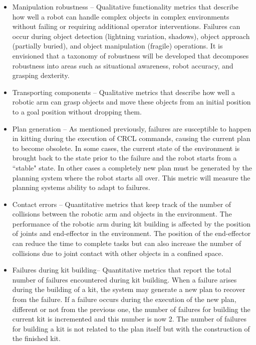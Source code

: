 \begin{itemize}
\item \sf Manipulation robustness \rm -- Qualitative functionality metrics that describe how well a robot can handle complex objects in complex environments without failing or requiring additional operator interventions. Failures can occur during object detection (lightning variation, shadows), object approach (partially buried), and object manipulation (fragile) operations.
It is envisioned that a taxonomy of robustness will be developed that decomposes robustness into areas such as situational awareness, robot accuracy, and grasping dexterity.\\

\item \sf Transporting components \rm -- Qualitative metrics that describe how well a robotic arm can grasp objects and move these objects from an initial position to a goal position without dropping them.\\

\item \sf Plan generation \rm -- As mentioned previously, failures are susceptible to happen in kitting during the execution of CRCL commands, causing the current plan to become obsolete. In some cases, the current state of the environment is brought back to the state prior to the failure and the robot starts from a ``stable" state. In other cases a completely new plan must be generated by the planning system where the robot starts all over. This metric will measure the planning systems ability to adapt to failures.\\

\item \sf Contact errors \rm -- Quantitative metrics that keep track of the number of collisions between the robotic arm and objects in the environment. The performance of the robotic arm during kit building is affected by the position of joints and end-effector in the environment. The position of the end-effector can reduce the time to complete tasks but can also increase the number of collisions due to joint contact with other objects in a confined space.\\

\item \sf Failures during kit building\rm -- Quantitative metrics that report the total number of failures encountered during kit building. When a failure arises during the building of a kit, the system may generate a new plan to recover from the failure. If a failure occurs during the execution of the new plan, different or not from the previous one, the number of failures for building the current kit is incremented and this number is now 2. The number of failures for building a kit is not related to the plan itself but with the construction of the finished kit. \\


\end{itemize}
